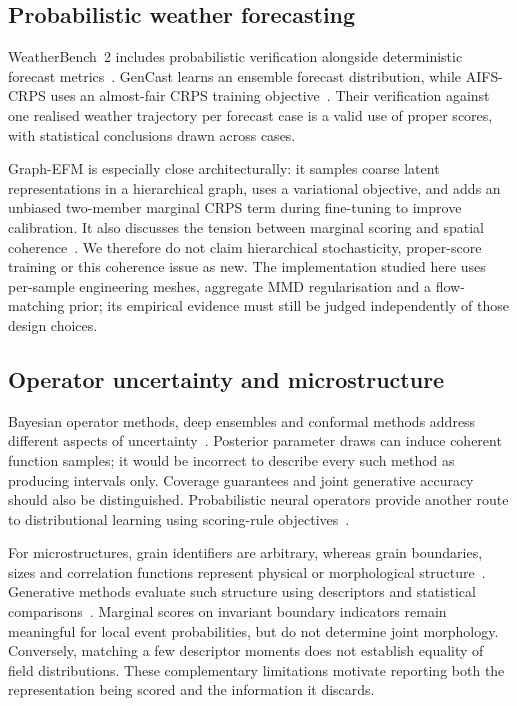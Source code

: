 \subsection{Probabilistic weather forecasting}
\label{sec:related:weather}

WeatherBench~2 includes probabilistic verification alongside deterministic
forecast metrics~\cite{rasp2024weatherbench2}. GenCast learns an ensemble
forecast distribution, while AIFS-CRPS uses an almost-fair CRPS training
objective~\cite{price2025gencast,lang2026aifscrps}. Their verification against
one realised weather trajectory per forecast case is a valid use of proper
scores, with statistical conclusions drawn across cases.

Graph-EFM is especially close architecturally: it samples coarse latent
representations in a hierarchical graph, uses a variational objective, and
adds an unbiased two-member marginal CRPS term during fine-tuning to improve
calibration. It also discusses the tension between marginal scoring and
spatial coherence~\cite{oskarsson2024graphefm}. We therefore do not claim
hierarchical stochasticity, proper-score training or this coherence issue as
new. The implementation studied here uses per-sample engineering meshes,
aggregate MMD regularisation and a flow-matching prior; its empirical evidence
must still be judged independently of those design choices.

\subsection{Operator uncertainty and microstructure}
\label{sec:related:operatoruq}
\label{sec:related:micro}

Bayesian operator methods, deep ensembles and conformal methods address
different aspects of uncertainty~\cite{magnani2022approximatebno,
lakshminarayanan2017deepensembles,ma2024calibrated,psaros2023uqsciml}.
Posterior parameter draws can induce coherent function samples; it would be
incorrect to describe every such method as producing intervals only.
Coverage guarantees and joint generative accuracy should also be distinguished.
Probabilistic neural operators provide another route to distributional
learning using scoring-rule objectives~\cite{bulte2025pno}.

For microstructures, grain identifiers are arbitrary, whereas grain boundaries,
sizes and correlation functions represent physical or morphological
structure~\cite{torquato2002random,plimpton2009spparks}. Generative methods
evaluate such structure using descriptors and statistical
comparisons~\cite{mosser2017porousgan,kench2021slicegan,hoffman2025grainpaint}.
Marginal scores on invariant boundary indicators remain meaningful for local
event probabilities, but do not determine joint morphology. Conversely,
matching a few descriptor moments does not establish equality of field
distributions. These complementary limitations motivate reporting both the
representation being scored and the information it discards.

